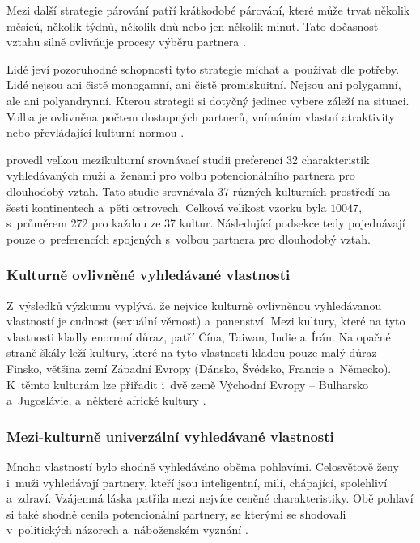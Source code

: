 \documentclass[a4paper, 12pt, notitlepage, oneside, numbers=noenddot]{report}
\begin{document}
Mezi další strategie párování patří krátkodobé párování, které může
trvat několik měsíců, několik týdnů, několik dnů nebo jen několik
minut.  Tato dočasnost vztahu silně ovlivňuje procesy výběru partnera
\citep{Buss2007}.

Lidé jeví pozoruhodné schopnosti tyto strategie míchat a~používat dle
potřeby.  Lidé nejsou ani čistě monogamní, ani čistě promiskuitní.
Nejsou ani polygamní, ale ani poly\-an\-dryn\-ní.  Kterou strategii si
dotyčný jedinec vybere záleží na situaci.  Volba je ovlivněna počtem
dostupných partnerů, vnímáním vlastní atraktivity nebo převládající
kulturní normou \citep{Buss2007,Murstein1970}.

\citet{BussEtAl1990,Buss2007} provedl velkou mezikulturní srovnávací
studii preferencí 32 charakteristik vyhledávaných muži a~ženami pro
volbu potencionálního partnera pro dlouhodobý vztah.  Tato studie
srovnávala 37 různých kulturních prostředí na šesti kontinentech
a~pěti ostrovech.  Celková velikost vzorku byla $10047$, s~průměrem
272 pro každou ze 37 kultur.  Následující podsekce tedy pojednávají
pouze o~preferencích spojených s~volbou partnera pro dlouhodobý vztah.

\subsubsection{Kulturně ovlivněné vyhledávané vlastnosti}

Z~výsledků výzkumu vyplývá, že nejvíce kulturně ovlivněnou
vyhledávanou vlastností je cudnost (sexuální věrnost) a~panenství.
Mezi kultury, které na tyto vlastnosti kladly enormní důraz, patří
Čína, Taiwan, Indie a~Írán.  Na opačné straně škály leží kultury,
které na tyto vlastnosti kladou pouze malý důraz -- Finsko, většina
zemí Západní Evropy (Dánsko, Švédsko, Francie a~Německo).  K~těmto
kulturám lze přiřadit i~dvě země Východní Evropy -- Bulharsko
a~Jugoslávie, a~některé africké kultury \citep{BussEtAl1990,Buss2007}.

\subsubsection{Mezi-kulturně univerzální vyhledávané vlastnosti}

Mnoho vlastností bylo shodně vyhledáváno oběma pohlavími.  Celosvětově
ženy i~muži vyhledávají partnery, kteří jsou inteligentní, milí,
chápající, spolehliví a~zdraví.  Vzájemná láska patřila mezi nejvíce
ceněné charakteristiky.  Obě pohlaví si také shodně cenila
potencionální partnery, se kterými se shodovali v~politických názorech
a~náboženském vyznání \citep{Buss2007}.
\end{document}

